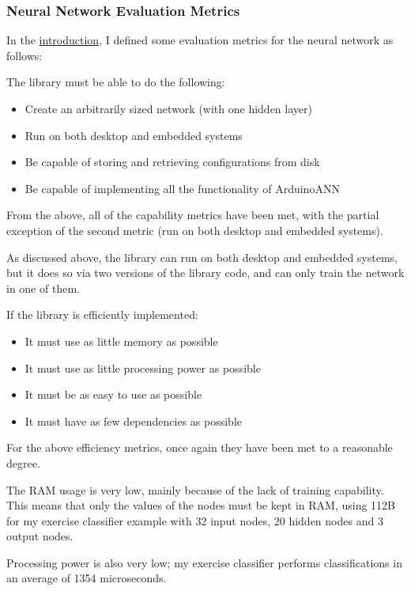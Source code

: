 \documentclass[a4paper]{article}
\begin{document}
\subsubsection{Neural Network Evaluation Metrics}

In the \hyperref[subsubsec:in_cs_nnmetrics]{introduction}, I defined some evaluation metrics for the neural network as follows:

The library must be able to do the following:

\begin{itemize}
\item Create an arbitrarily sized network (with one hidden layer)
\item Run on both desktop and embedded systems
\item Be capable of storing and retrieving configurations from disk
\item Be capable of implementing all the functionality of ArduinoANN
\end{itemize}

From the above, all of the capability metrics have been met, with the partial exception of the second metric (run on both desktop and embedded systems).

As discussed above, the library can run on both desktop and embedded systems, but it does so via two versions of the library code, and can only train the network in one of them.

If the library is efficiently implemented:

\begin{itemize}
\item It must use as little memory as possible
\item It must use as little processing power as possible
\item It must be as easy to use as possible
\item It must have as few dependencies as possible
\end{itemize}

For the above efficiency metrics, once again they have been met to a reasonable degree. 

The RAM usage is very low, mainly because of the lack of training capability. This means that only the values of the nodes must be kept in RAM, using 112B for my exercise classifier example with 32 input nodes, 20 hidden nodes and 3 output nodes.

Processing power is also very low; my exercise classifier performs classifications in an average of 1354 microseconds\cite{dsref0}.
\end{document}
